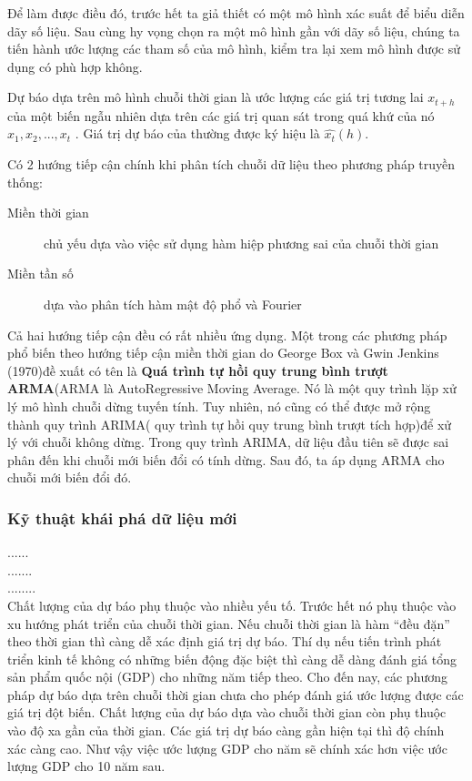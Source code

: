 \documentclass[twoside,12pt]{Latex/Classes/PhDthesisPSnPDF}
\begin{document}
Để làm được điều đó, trước hết ta giả thiết có một mô hình xác suất để biểu diễn dãy số liệu. Sau cùng hy vọng chọn ra một mô hình gần với dãy số liệu, chúng ta tiến hành ước lượng các tham số của mô hình, kiểm tra lại xem mô hình được sử dụng có phù hợp không.

Dự báo dựa trên mô hình chuỗi thời gian là ước lượng các giá trị tương lai $x_{t+h}$  của một biến ngẫu nhiên dựa trên các giá trị quan sát trong quá khứ của nó $x_1,x_2,...,x_t$ . Giá trị dự báo của   thường được ký hiệu là $\hat{x_t}(h)$.


Có 2 hướng tiếp cận chính \citep{cits} khi phân tích chuỗi dữ liệu theo phương pháp truyền thống:
\begin{description}
  \item[Miền thời gian] chủ yếu dựa vào việc sử dụng hàm hiệp phương sai của chuỗi thời gian
  \item[Miền tần số] dựa vào phân tích hàm mật độ phổ và Fourier
\end{description}
Cả hai hướng tiếp cận đều có rất nhiều ứng dụng. Một trong các phương pháp phổ biến theo hướng tiếp cận miền thời gian do George Box và Gwin Jenkins (1970)\cite{ross}đề xuất có tên là \textbf{Quá trình tự hồi quy trung bình trượt ARMA}(ARMA là AutoRegressive Moving Average. Nó là một quy trình lặp xử lý mô hình chuỗi dừng tuyến tính. Tuy nhiên, nó cũng có thể được mở rộng thành quy trình ARIMA( quy trình tự hồi quy trung bình trượt tích hợp)để xử lý với chuỗi không dừng. Trong quy trình ARIMA, dữ liệu đầu tiên sẽ được sai phân đến khi chuỗi mới biến đổi có tính dừng. Sau đó, ta áp dụng ARMA cho chuỗi mới biến đổi đó.

\subsubsection{Kỹ thuật khái phá dữ liệu mới}
......\\
.......\\
........\\

Chất lượng của dự báo phụ thuộc vào nhiều yếu tố. Trước hết nó phụ thuộc vào xu hướng phát triển của chuỗi thời gian. Nếu chuỗi thời gian là hàm “đều đặn” theo thời gian thì càng dễ xác định giá trị dự báo. Thí dụ nếu tiến trình phát triển kinh tế không có những biến động đặc biệt thì càng dễ dàng đánh giá tổng sản phẩm quốc nội (GDP) cho những năm tiếp theo. Cho đến nay, các phương pháp dự báo dựa trên chuỗi thời gian chưa cho phép đánh giá ước lượng được các giá trị đột biến. Chất lượng của dự báo dựa vào chuỗi thời gian còn phụ thuộc vào độ xa gần của thời gian. Các giá trị dự báo càng gần hiện tại thì độ chính xác càng cao. Như vậy việc ước lượng GDP cho năm sẽ chính xác hơn việc ước lượng GDP cho 10 năm sau.
\end{document}
